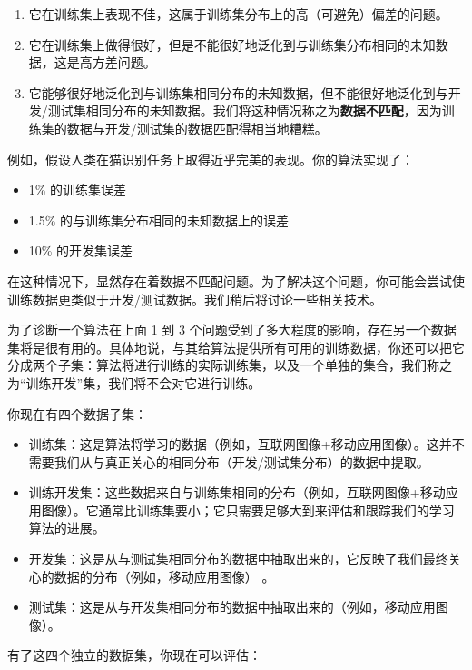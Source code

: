 \begin{enumerate}
\def\labelenumi{\arabic{enumi}.}
\tightlist
\item
  它在训练集上表现不佳，这属于训练集分布上的高（可避免）偏差的问题。
\item
  它在训练集上做得很好，但是不能很好地泛化到与训练集分布相同的未知数据，这是高方差问题。
\item
  它能够很好地泛化到与训练集相同分布的未知数据，但不能很好地泛化到与开发/测试集相同分布的未知数据。我们将这种情况称之为\textbf{数据不匹配}，因为训练集的数据与开发/测试集的数据匹配得相当地糟糕。
\end{enumerate}

例如，假设人类在猫识别任务上取得近乎完美的表现。你的算法实现了：

\begin{itemize}
\tightlist
\item
  1\% 的训练集误差
\item
  1.5\% 的与训练集分布相同的未知数据上的误差
\item
  10\% 的开发集误差
\end{itemize}

在这种情况下，显然存在着数据不匹配问题。为了解决这个问题，你可能会尝试使训练数据更类似于开发/测试数据。我们稍后将讨论一些相关技术。

为了诊断一个算法在上面 1 到 3
个问题受到了多大程度的影响，存在另一个数据集将是很有用的。具体地说，与其给算法提供所有可用的训练数据，你还可以把它分成两个子集：算法将进行训练的实际训练集，以及一个单独的集合，我们称之为``训练开发''集，我们将不会对它进行训练。

你现在有四个数据子集：

\begin{itemize}
\tightlist
\item
  训练集：这是算法将学习的数据（例如，互联网图像+移动应用图像）。这并不需要我们从与真正关心的相同分布（开发/测试集分布）的数据中提取。
\item
  训练开发集：这些数据来自与训练集相同的分布（例如，互联网图像+移动应用图像）。它通常比训练集要小；它只需要足够大到来评估和跟踪我们的学习算法的进展。
\item
  开发集：这是从与测试集相同分布的数据中抽取出来的，它反映了我们最终关心的数据的分布（例如，移动应用图像）
  。
\item
  测试集：这是从与开发集相同分布的数据中抽取出来的（例如，移动应用图像）。
\end{itemize}

有了这四个独立的数据集，你现在可以评估：

